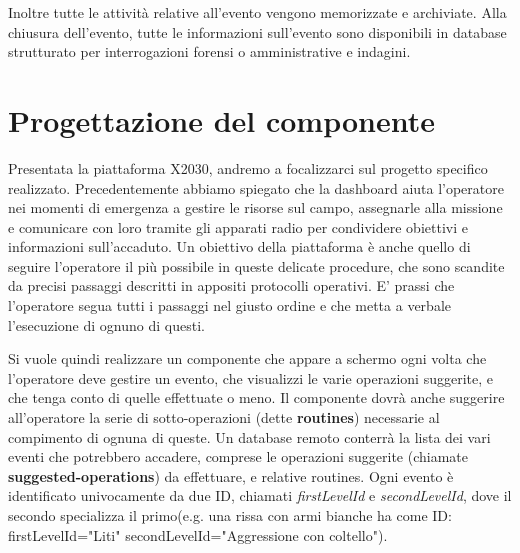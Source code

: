 Inoltre tutte le attività relative all'evento vengono memorizzate e archiviate.
Alla chiusura dell'evento, tutte le informazioni sull'evento sono disponibili in
database strutturato per interrogazioni forensi o amministrative
e indagini.

\pagebreak

\section{Progettazione del componente}
Presentata la piattaforma X2030, andremo a focalizzarci sul progetto specifico realizzato.
Precedentemente abbiamo spiegato che la dashboard aiuta l'operatore nei momenti di emergenza a gestire le 
risorse sul campo, assegnarle alla missione e comunicare con loro tramite gli apparati radio per 
condividere obiettivi e informazioni sull'accaduto.
Un obiettivo della piattaforma è anche quello di seguire l'operatore il più possibile in 
queste delicate procedure,
che sono scandite da precisi passaggi descritti in appositi protocolli operativi.
E' prassi che l'operatore segua tutti i passaggi nel giusto ordine
e che metta a verbale l'esecuzione di ognuno di questi.

Si vuole quindi realizzare un componente che appare a schermo ogni volta che l'operatore deve
 gestire un evento,
che visualizzi le varie operazioni suggerite, e che tenga conto di quelle effettuate o meno.
Il componente dovrà anche suggerire all'operatore la serie di sotto-operazioni (dette \textbf{routines}) 
necessarie al
compimento di ognuna di queste.
Un database remoto conterrà la lista dei vari eventi che potrebbero accadere, comprese le operazioni 
suggerite (chiamate \textbf{suggested-operations}) da effettuare, e relative routines.
Ogni evento è identificato univocamente da due ID, chiamati \emph{firstLevelId} e \emph{secondLevelId}, 
dove il secondo specializza il primo(e.g. una rissa con armi bianche ha come ID: firstLevelId="Liti" 
secondLevelId="Aggressione con coltello").



